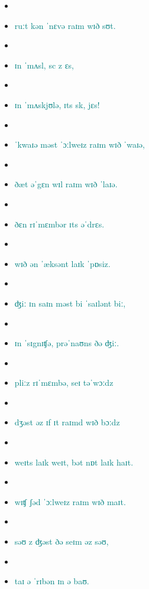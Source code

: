 \begin{itemize}
\item {}
\item \textcolor{teal}{ruːt kən ˈnɛvə raɪm wɪð sʊt.}
\item {}
\item \textcolor{teal}{ɪn ˈmʌsl, sc z ɛs,}
\item {}
\item \textcolor{teal}{ɪn ˈmʌskjʊlə, ɪts sk, jɛs!}
\item {}
\item \textcolor{teal}{ˈkwaɪə məst ˈɔːlweɪz raɪm wɪð ˈwaɪə,}
\item {}
\item \textcolor{teal}{ðæt əˈgɛn wɪl raɪm wɪð ˈlaɪə.}
\item {}
\item \textcolor{teal}{ðɛn rɪˈmɛmbər ɪts əˈdrɛs.}
\item {}
\item \textcolor{teal}{wɪð ən ˈæksənt laɪk ˈpɒsiz.}
\item {}
\item \textcolor{teal}{ʤiː ɪn saɪn məst bi ˈsaɪlənt biː,}
\item {}
\item \textcolor{teal}{ɪn ˈsɪgnɪʧə, prəˈnaʊns ðə ʤiː.}
\item {}
\item \textcolor{teal}{pliːz rɪˈmɛmbə, seɪ təˈwɔːdz}
\item {}
\item \textcolor{teal}{dʒəst əz ɪf ɪt raɪmd wɪð bɔːdz}
\item {}
\item \textcolor{teal}{weɪts laɪk weɪt, bət nɒt laɪk haɪt.}
\item {}
\item \textcolor{teal}{wɪʧ ʃəd ˈɔːlweɪz raɪm wɪð maɪt.}
\item {}
\item \textcolor{teal}{səʊ z ʤəst ðə seɪm əz səʊ,}
\item {}
\item \textcolor{teal}{taɪ ə ˈrɪbən ɪn ə baʊ.}

\end{itemize}
